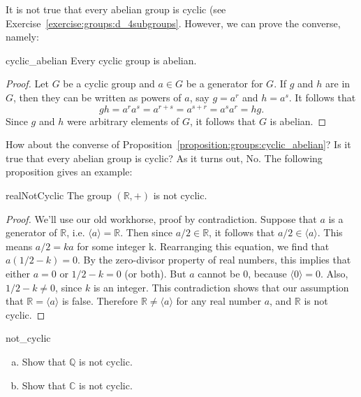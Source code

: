 It is not true that every abelian group is cyclic (see Exercise~\ref{exercise:groups:d_4subgroups}.  However, we can prove the converse, namely:
 
\begin{prop}{cyclic_abelian}
Every cyclic group is abelian.
\end{prop}
 
 
\begin{proof}
Let $G$ be a cyclic group and $a \in G$ be a generator for $G$. If
$g$ and $h$ are in $G$, then they can be written as powers of $a$,
say $g = a^r$ and $h = a^s$. It follows that
\[
g  h = a^r a^s = a^{r+s} = a^{s+r} = a^s a^r = h g.
\]
Since $g$ and $h$ were arbitrary elements of $G$, it follows that $G$ is abelian.
\end{proof}
 
How about the converse of Proposition~\ref{proposition:groups:cyclic_abelian}? Is it true that every abelian group is cyclic? As it turns out, No. The following proposition gives an example:

\begin{prop}{realNotCyclic}
The group $({\mathbb R},+)$ is not cyclic.
\end{prop}

\begin{proof}
We'll use our old workhorse, proof by contradiction.  Suppose that $a$ is a generator of $\mathbb{R}$, i.e. $\langle a \rangle = \mathbb{R}$.  Then since $a/2 \in  \mathbb{R}$, it follows that  $a/2 \in \langle a \rangle$. This means $a/2 =ka$ for some integer k.  Rearranging this equation, we find that $a(1/2-k)=0$.  By the zero-divisor property of real numbers, this implies that either $a=0$ or $1/2-k = 0$ (or both). But $a$ cannot be 0, because $\langle 0 \rangle = 0$.  Also, $1/2-k \neq 0$, since $k$ is an integer.  This contradiction shows that  our assumption that ${\mathbb R} = \langle a \rangle$ is false. Therefore ${\mathbb R} \neq \langle a \rangle$ for any real number $a$, and ${\mathbb R}$ is not cyclic.
\end{proof}

\begin{exercise}{not_cyclic}
\begin{enumerate}[(a)]
\item
Show that ${\mathbb Q}$ is not cyclic.   
\item
Show that ${\mathbb C}$ is not cyclic.
\end{enumerate}
\end{exercise}
 
